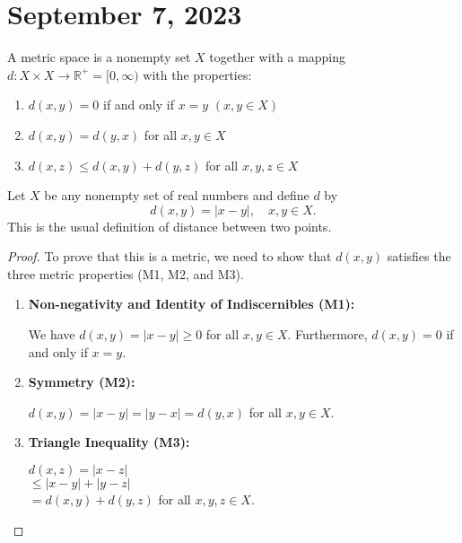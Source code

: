 \begin{abstract}
\end{abstract}

\section{September 7, 2023}
\begin{definition}
    A metric space is a nonempty set \( X \) together with a mapping \( d: X \times X \rightarrow \mathbb{R}^+ = [ 0, \infty) \) with the properties:
    \begin{enumerate}
        \item \( d(x, y) = 0 \) if and only if \( x = y \) \quad \( (x, y \in X) \)
        \item \( d(x, y) = d(y, x) \) for all \( x, y \in X \)
        \item \( d(x, z) \leq d(x, y) + d(y, z) \) for all \( x, y, z \in X \)
    \end{enumerate}
\end{definition}

\begin{example}
    Let \( X \) be any nonempty set of real numbers and define \( d \) by
    \[
    d(x, y) = |x - y|, \quad x, y \in X.
    \]
    This is the usual definition of distance between two points. 
\end{example}
\begin{proof}
To prove that this is a metric, we need to show that \( d(x, y) \) satisfies the three metric properties (M1, M2, and M3).

\begin{enumerate}
    \item \textbf{Non-negativity and Identity of Indiscernibles (M1):}
    
    We have \( d(x, y) = |x - y| \geq 0 \) for all \( x, y \in X \). Furthermore, \( d(x, y) = 0 \) if and only if \( x = y \).
    
    \item \textbf{Symmetry (M2):}
    
    \( d(x, y) = |x - y| = |y - x| = d(y, x) \) for all \( x, y \in X \).
    
    \item \textbf{Triangle Inequality (M3):}
    
    \( d(x, z) = |x - z| \) \\
    \( \leq |x - y| + |y - z| \) \\
    \( = d(x, y) + d(y, z) \) for all \( x, y, z \in X \).
\end{enumerate}
\end{proof}


